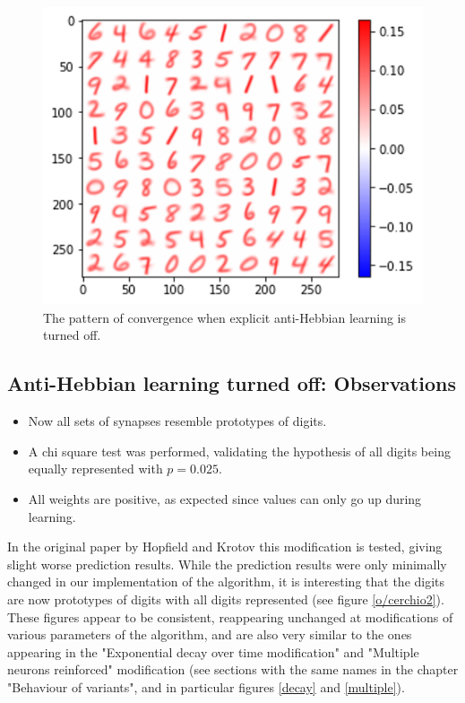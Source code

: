\documentclass[a4paper]{report}
\begin{document}
\begin{figure} [H]
    \centering
    \includegraphics [width=12cm ] {h/nodelta.png}
    \caption{The pattern of convergence when explicit anti-Hebbian learning is turned off.}
    \label{nodelta}
\end{figure}

\subsection{Anti-Hebbian learning turned off: Observations}

\begin{itemize}
    \item Now all sets of synapses resemble prototypes of digits.
    \item A chi square test was performed, validating the hypothesis of all digits being equally represented with $p  = 0.025$.
    \item All weights are positive, as expected since values can only go up during learning.
\end{itemize}

In the original paper by Hopfield and Krotov this modification is tested, giving slight worse prediction results.
While the prediction results were only minimally changed in our implementation of the algorithm, it is interesting that the digits are now prototypes of digits with all digits represented (see figure \ref{o/cerchio2}).
These figures appear to be consistent, reappearing unchanged at modifications of various parameters of the algorithm, and are also very similar to the ones appearing in the "Exponential decay over time modification" and "Multiple neurons reinforced" modification (see sections with the same names in the chapter "Behaviour of variants", and in particular figures \ref{decay} and \ref{multiple}).
\end{document}
